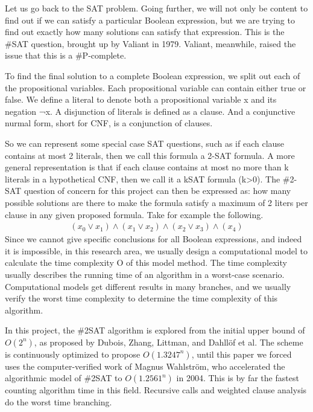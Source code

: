 \documentclass{sigchi}
\begin{document}
Let us go back to the SAT problem. Going further, we will not only be content to find out if we can satisfy a particular Boolean expression, but we are trying to find out exactly how many solutions can satisfy that expression. This is the \#SAT question, brought up by Valiant in 1979.\cite{10.1016/0304-3975(79)90044-6} Valiant, meanwhile, raised the issue that this is a \#P-complete.

To find the final solution to a complete Boolean expression, we split out each of the propositional variables. Each propositional variable can contain either true or false. We define a literal to denote both a propositional variable x and its negation ¬x. A disjunction of literals is defined as a clause. And a conjunctive nurmal form, short for CNF, is a conjunction of clauses.

So we can represent some special case SAT questions, such as if each clause contains at most 2 literals, then we call this formula a 2-SAT formula. A more general representation is that if each clause contains at most no more than k literals in a hypothetical CNF, then we call it a k\-SAT formula (k>0). The \#2-SAT question of concern for this project can then be expressed as: how many possible solutions are there to make the formula satisfy a maximum of 2 liters per clause in any given proposed formula. Take for example the following.
\begin{align*}  
\left ( x_{0}\vee x_{1} \right )\wedge \left ( x_{1}\vee x_{2} \right )\wedge \left ( x_{2}\vee  x_{3} \right )\wedge \left ( x_{4}\right )
\end{align*}
Since we cannot give specific conclusions for all Boolean expressions, and indeed it is impossible, in this research area, we usually design a computational model to calculate the time complexity O of this model method. The time complexity usually describes the running time of an algorithm in a worst-case scenario. Computational models get different results in many branches, and we usually verify the worst time complexity to determine the time complexity of this algorithm.

In this project, the \#2SAT algorithm is explored from the initial upper bound of $ O\left ( 2^{n} \right )$, as proposed by Dubois, Zhang, Littman, and Dahllöf\cite{10.1007/3-540-45655-4_57} et al. The scheme is continuously optimized to propose $ O\left ( 1.3247^{n} \right )$, until this paper we forced uses the computer-verified work of Magnus Wahlström, who accelerated the algorithmic model of \#2SAT to $ O\left ( 1.2561^{n} \right )$ in 2004\cite{10.1016/j.tcs.2004.10.037}. This is by far the fastest counting algorithm time in this field. Recursive calls and weighted clause analysis do the worst time branching.
\end{document}
